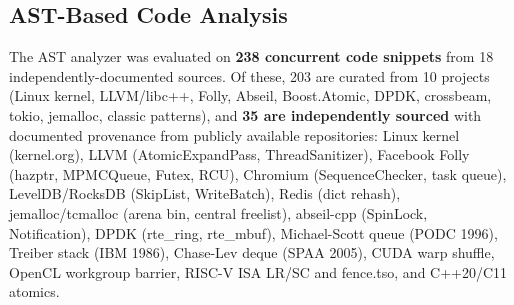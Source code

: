 \documentclass[11pt]{article}
\begin{document}
\subsection{AST-Based Code Analysis}
\label{sec:code-analysis}

The AST analyzer was evaluated on \textbf{238 concurrent code
snippets} from 18 independently-documented sources.
Of these, 203 are curated from 10 projects
(Linux kernel, LLVM\slash libc++, Folly, Abseil,
Boost.Atomic, DPDK, crossbeam, tokio, jemalloc, classic patterns),
and \textbf{35 are independently sourced} with documented provenance from
publicly available repositories: Linux kernel (kernel.org),
LLVM (AtomicExpandPass, ThreadSanitizer), Facebook Folly
(hazptr, MPMCQueue, Futex, RCU), Chromium (SequenceChecker, task queue),
LevelDB/RocksDB (SkipList, WriteBatch), Redis (dict rehash),
jemalloc/tcmalloc (arena bin, central freelist),
abseil-cpp (SpinLock, Notification), DPDK (rte\_ring, rte\_mbuf),
Michael-Scott queue (PODC 1996), Treiber stack (IBM 1986),
Chase-Lev deque (SPAA 2005), CUDA warp shuffle, OpenCL workgroup barrier,
RISC-V ISA LR/SC and fence.tso, and C++20/C11 atomics.
\end{document}
